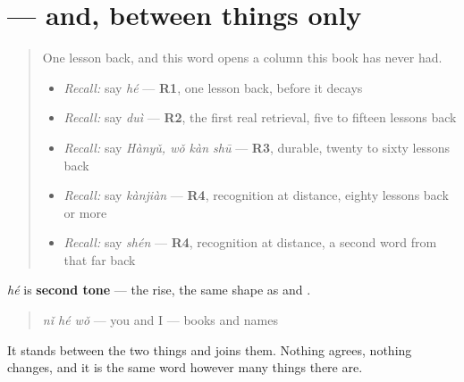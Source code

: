 \section[\texorpdfstring{\zh{和} (hé)}{和 (hé)}]{ — and, between things only}

\label{lesson:ZH-C27-he}



\begin{quote}
One lesson back, and this word opens a column this book has never had.

\begin{itemize}
\raggedright
  \item \emph{Recall:} say \emph{hé} — \textbf{R1}, one lesson back, before it decays
  \item \emph{Recall:} say \emph{duì} — \textbf{R2}, the first real retrieval, five to fifteen lessons back
  \item \emph{Recall:} say \emph{Hànyǔ, wǒ kàn shū} — \textbf{R3}, durable, twenty to sixty lessons back
  \item \emph{Recall:} say \emph{kànjiàn} — \textbf{R4}, recognition at distance, eighty lessons back or more
  \item \emph{Recall:} say \emph{shén} — \textbf{R4}, recognition at distance, a second word from that far back
\end{itemize}
\end{quote}

\begin{sounds}
\textbf{} \emph{hé} is \textbf{second tone} — the rise, the same shape as  and .

\begin{quote}
\textbf{} \emph{nǐ hé wǒ} — you and I \textbf{} — books and names \textbf{}
\end{quote}

It stands between the two things and joins them. Nothing agrees, nothing changes, and it is the same word however many things there are.
\end{sounds}

